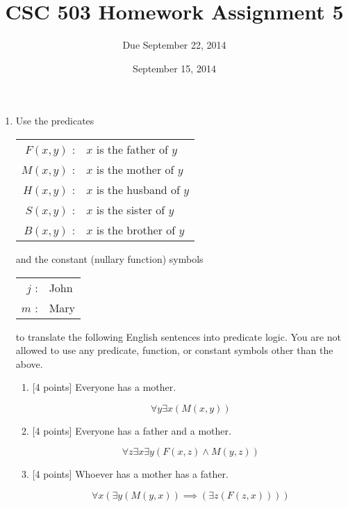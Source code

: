 \documentclass{article}
\title{CSC 503 Homework Assignment 5}
\author{Due September 22, 2014}
\date{September 15, 2014}
\begin{document}
\maketitle

\begin{enumerate}

\item Use the predicates
  \begin{center}
    \begin{tabular}{rl}
      $F(x,y)$ : & $x$ is the father of $y$ \\
      $M(x,y)$ : & $x$ is the mother of $y$ \\
      $H(x,y)$ : & $x$ is the husband of $y$ \\
      $S(x,y)$ : & $x$ is the sister of $y$ \\
      $B(x,y)$ : & $x$ is the brother of $y$ \\
    \end{tabular}
  \end{center}
and the constant (nullary function) symbols
  \begin{center}
    \begin{tabular}{rl}
      $j$ : & John \\
      $m$ : & Mary \\
    \end{tabular}
  \end{center}
to translate the following English sentences into predicate logic.
You are not allowed to use any predicate, function, or constant
symbols other than the above.
\begin{enumerate}
\item {[4 points]} Everyone has a mother.
\begin{answer}
	\begin{displaymath}
		\forall y \exists x (M(x, y))
	\end{displaymath}
\end{answer}
\item {[4 points]} Everyone has a father and a mother.
\begin{answer}
	\begin{displaymath}
		\forall z \exists x \exists y (F(x, z) \land M(y, z))
	\end{displaymath}
\end{answer}
\item {[4 points]} Whoever has a mother has a father.
\begin{answer}
	\begin{displaymath}
		\forall x (\exists y (M(y, x)) \implies (\exists z (F(z, x)))) 

\end{displaymath}
\end{answer}
\end{enumerate}
\end{enumerate}
\end{document}
